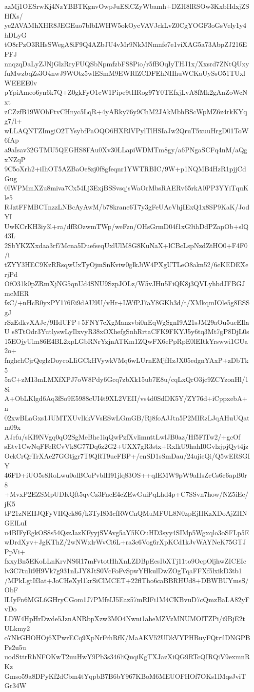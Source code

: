 azMj1OESrwKj4NzYBBTKgnvOwpJuE8lCZyWbamh+DZH8lRSOw3KxbHdxjZSHfXs/
ye2AVAMhXHR8JEGEuo7blbLWHW5okOycVAVJckLvZ0CgYOGF3oGsVely1y4hDLyG
tO8rPzO3RHsSWegA8iF9Q4AZbJU4vMr9NkMNmnfe7e1viXAG5a73AbpZJ216EPFJ
nnqzqDaLyZJNjGlzRryFUQSbNpmfzbFS8Pio/r5fBOqIyTHJ1x/Xxsrd7ZNtQUxy
fuMwzbqZs3O4nwJ9WOtz5wlESmM9EWRlZCDFEhNHhuWCKaUySsO51TUxlWEEEE0v
pYpiAmeo6yn6k7Q+Z0gkFyO1cW1Pipe9tHRog97Y0TEfxjLvA8fMk2gAnZoWcNxt
zCZzfB19WOhFtvCHnyc5LqR+4yARky76y9ChM2JAkMbhBScWpMZ6z4rkKYqg7/l+
wLLAQNTZImgiO2TYsybfPaOQO6HXRlVPylTlHSIaJw2QruT5xuuHrgD01ToW6fAp
a9aIsav32GTMU5QEGHS8FAu0Xv30LLapiWDMTm8gy/a6PNgaSCFq4nM/aQgxNZqP
9C5oXrh2+iIhOT5AZBaOe8zj0f8gfeqnr1YWTRBIC/9W+p1NQMB4HzR1pjjCdGug
0IWPMmXZu8miva7Cx54Lj3ExjBSSvsqjsWaOrMbsRAERv65rkA0PP3YYiTquKle5
RJztFFMBCTnzzLNBcAyAwM/b78krane6T7y3gFeUAcVhjIExQ1x8SP9KaK/JodYI
UwKCrKH3iy3l+ra/dfROzwmTWp/weFzn/OHsGrmD04f1xG9ihDdPZapOb+slQ43L
2SbYKZXxdaa3rf7Mcna5DuefseqUxlUlM8G8KuNaX+lCBcLspNzdZtHO0+F4F0/i
tZYY3HEC9KzRRsqwUxTyOjmSnKviw0glkJiW4PXgUTLeO8akn52/6cKEDEXerjPd
OfO31k0pZRmXjNG5qnUd4SNU9SzpJOLz/W5vJHu5FiQK8j3QVLyhbdJFBGJmcMER
fsC/+nHcR0yxPY176Ei9dAU9U/vHr+LWfPJ7aY8GKh3d/t/XMkqmIOle5g8ESSgJ
rSzEdkvXAJc/9HdUFP+5FNY7cXgManzvbi0nEqWgSgnI9A21sJM29aOu5ueEIlaU
s8TtOdr3YutlyswLyIlxvyR38xOXhefgSnhRrtaCFK9FKYJ5y6tq3Mt7gP8DjL0s
15EOjyUlm86E4BL2xpLGbRNrYzjnATKm1ZQwFX6ePpRpE0lEItkYrswwi1GUa2o+
fnghchCjrQeglzDoycoLIiGCkHVywkVMq6wLUrnEMjfHzJX05edgnYAxP+zDbTk5
5aC+zM13mLMXfXPJ7oW8Pdy6Gcq7zbXk15ub7E8u/cqLxQrO3jc9ZCYzonHl/18i
A+ObLKlgd6Aq3fSo9E5988cUI4t9XL2VEII/vs4d0SdDK5Y/ZY76d+iCppxebA+n
02xwBLaGxs1JUMTXUvIkkVVsESwLGmGB/Rj8foAJJtn5P2MIRzLJqAHuUQatm09x
AJrfu/sKI9NVgq0qO2SgMeBhc1iqQwPzfXvlimnttLwlJB0az/Hf5FlTw2/+gcOf
sEtv1CwNqFFeRCvVk8G77Dq6z2G2+UXX7gR3stx+RxlkU9hahI0GvlzjpjQyt4jz
OckCrQrTrXAe27GGtjgr7T9QRT9ueFBP+/enSD1sSmDau/24ujieQi/Q5wERSGIY
46FD+iUO5s8RoLwu0olBCoPvblH91jlq83OS++qIEMW9pW9aIIsZcCs6c6apB0r8
+MvxP2EZSMpUDKQft5qvCz3FncE4cZEwGuiPqLhd4p+C7SSvn7how/NZ5iEc/jK5
tP21zNEHJQFyVHQck86/k3TyI8McfRWCnQMuMFUL8N0zpEjHKzXDoAjZHNGElLuI
u4BIFyEgkOS8s54QszJazKFyyjSVAvg5aY5KOuHD3syy4SIMp5Wgxqlo3oSFLp5E
wDrdXyv+JgKThZ/2wNWxlrWvCi6L+ra3c6Vog6rXpKCd1kJvWAYNeK75GTJPpVi+
fxxyBn5EKoLLnKrvNS6l17mFvtotHhXnLZDBpEesIbXTj11to9OcpOljhwZICEIc
lv3C7tuIi9H9Vk7g931nLJY8JtS0VcFoFvSpwYHkulDwZOgTqaFFXf5lxikD3tb1
/MPkLgtIf3at+JoCHeXyl1krSiClMCET+22flTho6caBBRHUd8+DBWBUYmsS/ObF
lLIyFn6MGL6GHryCGom1J7PMfeIJ5Eaz57mRlFi1M4CKBvuD7cQmzBaLA82yFvDo
LDW4HpHrDwde5JznANRbpXzw3MO4Nwni1aheMZVzMNUMOlTZPi/i9BjE2tULkmy2
o7NkGHOHOj6XPwrECq9XpNrFrhRfK/MaAKV52UDkVYPHBuyFQtrilDNGPBPs2u5u
uodSttrRhNFOKwT2uuHwY9Pb3s346liQuqiKgTXJazXiQG9RTcQIRQiV9exmnRKz
Gmso59a8DPyKf2dCbm4tYqpbB7B6bY967KBoM6MEUOFHOf7OKs1lMqsJviTGr34W
